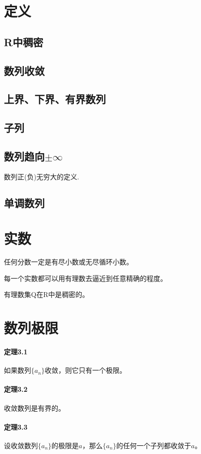 \documentclass[UTF8]{ctexart}
\begin{document}
	\section{定义}
	\subsection{R中稠密}
	\subsection{数列收敛}
	\subsection{上界、下界、有界数列}
	\subsection{子列}
	\subsection{数列趋向$\pm \infty$}数列正(负)无穷大的定义.
	\subsection{单调数列}
	
	\section{实数}
	任何分数一定是有尽小数或无尽循环小数。
	
	每一个实数都可以用有理数去逼近到任意精确的程度。
	
	有理数集Q在R中是稠密的。
	
	\section{数列极限}
	\paragraph{定理3.1}如果数列$\{a_n\}$收敛，则它只有一个极限。
	\paragraph{定理3.2}收敛数列是有界的。
	\paragraph{定理3.3}设收敛数列$\{a_n\}$的极限是$a$，那么$\{a_n\}$的任何一个子列都收敛于$a$。
\end{document}
